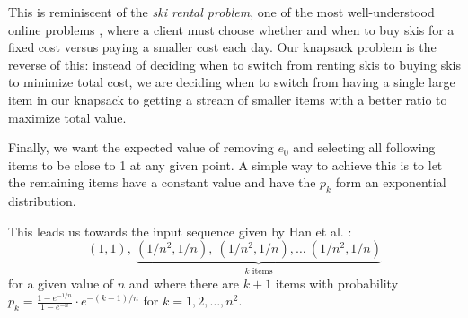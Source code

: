 This is reminiscent of the \emph{ski rental problem}, one of the most well-understood online problems \cite{karlin}, where a client must choose whether and when to buy skis for a fixed cost versus paying a smaller cost each day. Our knapsack problem is the reverse of this: instead of deciding when to switch from renting skis to buying skis to minimize total cost, we are deciding when to switch from having a single large item in our knapsack to getting a stream of smaller items with a better ratio to maximize total value.

Finally, we want the expected value of removing $e_0$ and selecting all following items to be close to 1 at any given point. A simple way to achieve this is to let the remaining items have a constant value and have the $p_k$ form an exponential distribution.

This leads us towards the input sequence given by Han et al. \cite{han}:
\begin{equation}
	\label{eq:knapsack_dist}
	(1,1),\ \underbrace{(1/n^2,1/n),\ (1/n^2,1/n),\ldots\ (1/n^2,1/n)}_{k \text{ items}}
\end{equation}
for a given value of $n$ and where there are $k+1$ items with probability $p_k = \frac{1-e^{-1/n}}{1-e^{-n}} \cdot e^{-(k-1)/n}$ for $k=1,2,\ldots,n^2$.

